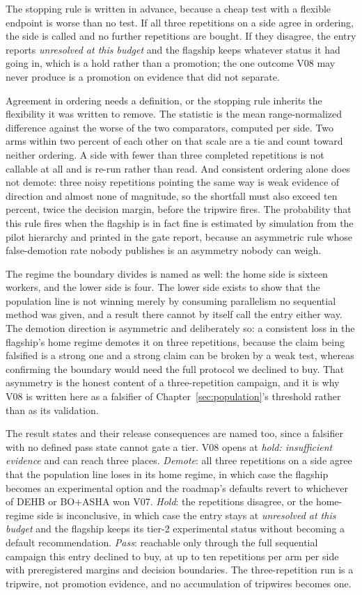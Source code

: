 The stopping rule is written in advance, because a cheap test with a
flexible endpoint is worse than no test. If all three repetitions on
a side agree in ordering, the side is called and no further
repetitions are bought. If they disagree, the entry reports
\emph{unresolved at this budget} and the flagship keeps whatever
status it had going in, which is a hold rather than a promotion; the
one outcome V08 may never produce is a promotion on evidence that did
not separate.

Agreement in ordering needs a definition, or the stopping rule inherits
the flexibility it was written to remove. The statistic is the mean
range-normalized difference against the worse of the two comparators,
computed per side. Two arms within two percent of each other on that
scale are a tie and count toward neither ordering. A side with fewer
than three completed repetitions is not callable at all and is re-run
rather than read. And consistent ordering alone does not demote: three
noisy repetitions pointing the same way is weak evidence of direction
and almost none of magnitude, so the shortfall must also exceed ten
percent, twice the decision margin, before the tripwire fires. The
probability that this rule fires when the flagship is in fact fine is
estimated by simulation from the pilot hierarchy and printed in the gate
report, because an asymmetric rule whose false-demotion rate nobody
publishes is an asymmetry nobody can weigh.

The regime the boundary divides is named as well: the home side is
sixteen workers, and the lower side is four. The lower side exists to
show that the population line is not winning merely by consuming
parallelism no sequential method was given, and a result there cannot
by itself call the entry either way. The demotion direction is asymmetric and deliberately
so: a consistent loss in the flagship's home regime demotes it on
three repetitions, because the claim being falsified is a strong one
and a strong claim can be broken by a weak test, whereas confirming
the boundary would need the full protocol we declined to buy. That
asymmetry is the honest content of a three-repetition campaign, and
it is why V08 is written here as a falsifier of
Chapter~\ref{sec:population}'s threshold rather than as its
validation.

The result states and their release consequences are named too, since
a falsifier with no defined pass state cannot gate a tier. V08 opens
at \emph{hold: insufficient evidence} and can reach three places.
\emph{Demote}: all three repetitions on a side agree that the
population line loses in its home regime, in which case the flagship
becomes an experimental option and the roadmap's defaults revert to
whichever of DEHB or BO+ASHA won V07. \emph{Hold}: the repetitions
disagree, or the home-regime side is inconclusive, in which case the
entry stays at \emph{unresolved at this budget} and the flagship
keeps its tier-2 experimental status without becoming a default
recommendation. \emph{Pass}: reachable only through the full
sequential campaign this entry declined to buy, at up to ten
repetitions per arm per side with preregistered margins and decision
boundaries. The three-repetition run is a tripwire, not promotion
evidence, and no accumulation of tripwires becomes one.

